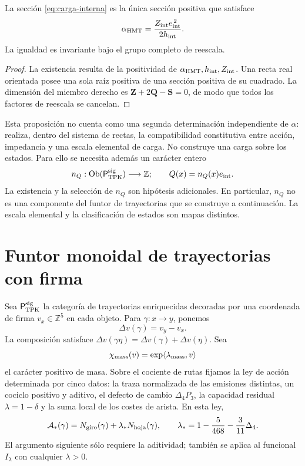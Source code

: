 \begin{proposition}
La sección \eqref{eq:carga-interna} es la única sección positiva que
satisface
\[
 \alpha_{\rm HMT}
 =\frac{Z_{\rm int}e_{\rm int}^{\,2}}{2h_{\rm int}}.
\]
La igualdad es invariante bajo el grupo completo de reescala.
\end{proposition}

\begin{proof}
La existencia resulta de la positividad de
\(\alpha_{\rm HMT},h_{\rm int},Z_{\rm int}\). Una recta real orientada
posee una sola raíz positiva de una sección positiva de su cuadrado. La
dimensión del miembro derecho es
\(\mathbf Z+2\mathbf Q-\mathbf S=0\), de modo que todos los factores de
reescala se cancelan.
\end{proof}

Esta proposición no cuenta como una segunda determinación independiente de
\(\alpha\): realiza, dentro del sistema de rectas, la compatibilidad
constitutiva entre acción, impedancia y una escala elemental de carga. No
construye una carga sobre los estados. Para ello se necesita además un
carácter entero
\[
 n_Q:\operatorname{Ob}(\mathsf P_{\rm TPK}^{\rm sig})\longrightarrow
 \mathbb Z;
 \qquad
 Q(x)=n_Q(x)e_{\rm int}.
\]
La existencia y la selección de \(n_Q\) son hipótesis adicionales. En
particular, \(n_Q\) no es una componente del funtor de trayectorias que se
construye a continuación. La escala elemental y la clasificación de estados
son mapas distintos.

\section{Funtor monoidal de trayectorias con firma}

Sea \(\mathsf P_{\rm TPK}^{\rm sig}\) la categoría de trayectorias
enriquecidas decoradas por una coordenada de firma
\(v_x\in\mathbb Z^5\) en cada objeto. Para
\(\gamma:x\to y\), ponemos
\[
 \Delta v(\gamma)=v_y-v_x.
\]
La composición satisface
\(\Delta v(\gamma\eta)=\Delta v(\gamma)+\Delta v(\eta)\).
Sea
\[
 \chi_{\rm mass}(v)=\exp\langle\lambda_{\rm mass},v\rangle
\]
el carácter positivo de masa. Sobre el cociente de rutas fijamos la ley de
acción determinada por cinco datos: la traza normalizada de las emisiones
distintas, un cociclo positivo y aditivo, el defecto de cambio
\(\Delta_4P_3\), la capacidad residual \(\lambda=1-\delta\) y la suma local
de los costes de arista. En esta ley,
\[
 \mathcal A_*(\gamma)
 =N_{\rm giro}(\gamma)+\lambda_*N_{\rm hoja}(\gamma),
 \qquad
 \lambda_*=1-\frac5{468}-\frac3{11}\Delta_4.
\]
El argumento siguiente sólo requiere la aditividad; también se aplica al
funcional \(I_\lambda\) con cualquier \(\lambda>0\).

